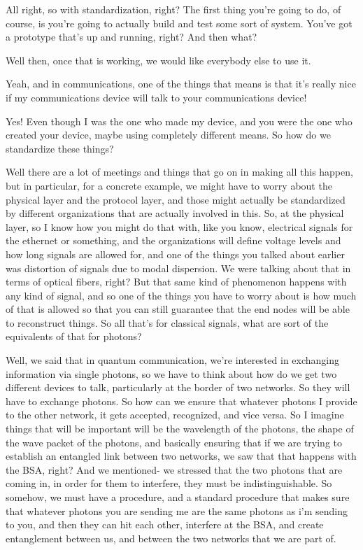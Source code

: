 All right, so with standardization, right? The first thing you're going to do, of course, is you're going to actually build and test some sort of system. You've got a prototype that's up and running, right? And then what?

Well then, once that is working, we would like everybody else to use it.

Yeah, and in communications, one of the things that means is that it's really nice if my communications device will talk to your communications device!

Yes! Even though I was the one who made my device, and you were the one who created your device, maybe using completely different means. So how do we standardize these things?

Well there are a lot of meetings and things that go on in making all this happen, but in particular, for a concrete example, we might have to worry about the physical layer and the protocol layer, and those might actually be standardized by different organizations that are actually involved in this. So, at the physical layer, so I know how you might do that with, like you know, electrical signals for the ethernet or something, and the organizations will define voltage levels and how long signals are allowed for, and one of the things you talked about earlier was distortion of signals due to modal dispersion. We were talking about that in terms of optical fibers, right? But that same kind of phenomenon happens with any kind of signal, and so one of the things you have to worry about is how much of that is allowed so that you can still guarantee that the end nodes will be able to reconstruct things. So all that's for classical signals, what are sort of the equivalents of that for photons?

Well, we said that in quantum communication, we're interested in exchanging information via single photons, so we have to think about how do we get two different devices to talk, particularly at the border of two networks. So they will have to exchange photons. So how can we ensure that whatever photons I provide to the other network, it gets accepted, recognized, and vice versa. So I imagine things that will be important will be the wavelength of the photons, the shape of the wave packet of the photons, and basically ensuring that if we are trying to establish an entangled link between two networks, we saw that that happens with the BSA, right? And we mentioned- we stressed that the two photons that are coming in, in order for them to interfere, they must be indistinguishable. So somehow, we must have a procedure, and a standard procedure that makes sure that whatever photons you are sending me are the same photons as i'm sending to you, and then they can hit each other, interfere at the BSA, and create entanglement between us, and between the two networks that we are part of.

